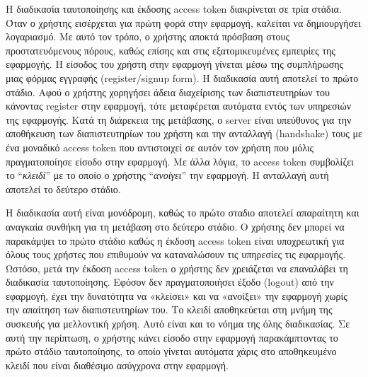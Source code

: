 Η διαδικασία ταυτοποίησης και έκδοσης access token διακρίνεται σε τρία στάδια. Όταν ο χρήστης εισέρχεται για πρώτη φορά στην εφαρμογή, καλείται να δημιουργήσει λογαριασμό. Με αυτό τον τρόπο, ο χρήστης αποκτά πρόσβαση στους προστατευόμενους πόρους, καθώς επίσης και στις εξατομικευμένες εμπειρίες της εφαρμογής. Η είσοδος του χρήστη στην εφαρμογή γίνεται μέσω της συμπλήρωσης μιας φόρμας εγγραφής (register/signup form). Η διαδικασία αυτή αποτελεί το πρώτο στάδιο. Αφού ο χρήστης χορηγήσει άδεια διαχείρισης των διαπιστευτηρίων του κάνοντας register στην εφαρμογή, τότε μεταφέρεται αυτόματα εντός των υπηρεσιών της εφαρμογής. Κατά τη διάρεκεια της μετάβασης, ο server είναι υπεύθυνος για την αποθήκευση των διαπιστευτηρίων του χρήστη και την ανταλλαγή (handshake) τους με ένα μοναδικό access token που αντιστοιχεί σε αυτόν τον χρήστη που μόλις πραγματοποίησε είσοδο στην εφαρμογή. Με άλλα λόγια, το access token συμβολίζει το ``\textit{κλειδί}'' με το οποίο ο χρήστης ``\textit{ανοίγει}'' την εφαρμογή. Η ανταλλαγή αυτή αποτελεί το δεύτερο στάδιο.

Η διαδικασία αυτή είναι μονόδρομη, καθώς το πρώτο σταδιο αποτελεί απαραίτητη και αναγκαία συνθήκη για τη μετάβαση στο δεύτερο στάδιο. Ο χρήστης δεν μπορεί να παρακάμψει το πρώτο στάδιο καθώς η έκδοση access token είναι υποχρεωτική για όλους τους χρήστες που επιθυμούν να καταναλώσουν τις υπηρεσίες τις εφαρμογής. Ωστόσο, μετά την έκδοση access token ο χρήστης δεν χρειάζεται να επαναλάβει τη διαδικασία ταυτοποίησης. Εφόσον δεν πραγματοποιήσει έξοδο (logout) από την εφαρμογή, έχει την δυνατότητα να «κλείσει» και να «ανοίξει» την εφαρμογή χωρίς την απαίτηση των διαπιστευτηρίων του. Το κλειδί αποθηκεύεται στη μνήμη της συσκευής για μελλοντική χρήση. Αυτό είναι και το νόημα της όλης διαδικασίας. Σε αυτή την περίπτωση, ο χρήστης κάνει είσοδο στην εφαρμογή παρακάμπτοντας το πρώτο στάδιο ταυτοποίησης, το οποίο γίνεται αυτόματα χάρις στο αποθηκευμένο κλειδί που είναι διαθέσιμο ασύγχρονα στην εφαρμογή. 

